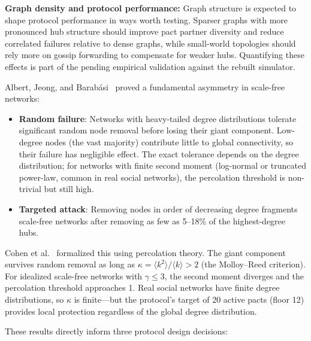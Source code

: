 \documentclass[11pt,a4paper]{article}
\begin{document}
\textbf{Graph density and protocol performance:} Graph structure is expected to shape protocol performance in ways worth testing. Sparser graphs with more pronounced hub structure should improve pact partner diversity and reduce correlated failures relative to dense graphs, while small-world topologies should rely more on gossip forwarding to compensate for weaker hubs. Quantifying these effects is part of the pending empirical validation against the rebuilt simulator.

Albert, Jeong, and Barab\'{a}si~\cite{albert-attack} proved a fundamental asymmetry in scale-free networks:

\begin{itemize}
  \item \textbf{Random failure}: Networks with heavy-tailed degree distributions tolerate significant random node removal before losing their giant component. Low-degree nodes (the vast majority) contribute little to global connectivity, so their failure has negligible effect. The exact tolerance depends on the degree distribution; for networks with finite second moment (log-normal or truncated power-law, common in real social networks), the percolation threshold is non-trivial but still high.
  \item \textbf{Targeted attack}: Removing nodes in order of decreasing degree fragments scale-free networks after removing as few as 5--18\% of the highest-degree hubs.
\end{itemize}

Cohen et al.~\cite{cohen-percolation} formalized this using percolation theory. The giant component survives random removal as long as $\kappa = \langle k^2 \rangle / \langle k \rangle > 2$ (the Molloy--Reed criterion). For idealized scale-free networks with $\gamma \leq 3$, the second moment diverges and the percolation threshold approaches 1. Real social networks have finite degree distributions, so $\kappa$ is finite---but the protocol's target of 20 active pacts (floor 12) provides local protection regardless of the global degree distribution.

These results directly inform three protocol design decisions:
\end{document}
